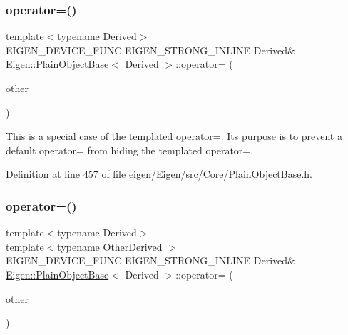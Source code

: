 \subsubsection{\texorpdfstring{operator=()}{operator=()}\hspace{0.1cm}{\footnotesize\ttfamily [2/4]}}
{\footnotesize\ttfamily template$<$typename Derived$>$ \\
E\+I\+G\+E\+N\+\_\+\+D\+E\+V\+I\+C\+E\+\_\+\+F\+U\+NC E\+I\+G\+E\+N\+\_\+\+S\+T\+R\+O\+N\+G\+\_\+\+I\+N\+L\+I\+NE Derived\& \hyperlink{class_eigen_1_1_plain_object_base}{Eigen\+::\+Plain\+Object\+Base}$<$ Derived $>$\+::operator= (\begin{DoxyParamCaption}\item[{const \hyperlink{class_eigen_1_1_plain_object_base}{Plain\+Object\+Base}$<$ Derived $>$ \&}]{other }\end{DoxyParamCaption})\hspace{0.3cm}{\ttfamily [inline]}}

This is a special case of the templated operator=. Its purpose is to prevent a default operator= from hiding the templated operator=. 

Definition at line \hyperlink{eigen_2_eigen_2src_2_core_2_plain_object_base_8h_source_l00457}{457} of file \hyperlink{eigen_2_eigen_2src_2_core_2_plain_object_base_8h_source}{eigen/\+Eigen/src/\+Core/\+Plain\+Object\+Base.\+h}.

\mbox{\label{class_eigen_1_1_plain_object_base_a6d280056e43429f043e8b25262ee6153}} 
\subsubsection{\texorpdfstring{operator=()}{operator=()}\hspace{0.1cm}{\footnotesize\ttfamily [3/4]}}
{\footnotesize\ttfamily template$<$typename Derived$>$ \\
template$<$typename Other\+Derived $>$ \\
E\+I\+G\+E\+N\+\_\+\+D\+E\+V\+I\+C\+E\+\_\+\+F\+U\+NC E\+I\+G\+E\+N\+\_\+\+S\+T\+R\+O\+N\+G\+\_\+\+I\+N\+L\+I\+NE Derived\& \hyperlink{class_eigen_1_1_plain_object_base}{Eigen\+::\+Plain\+Object\+Base}$<$ Derived $>$\+::operator= (\begin{DoxyParamCaption}\item[{const \hyperlink{group___core___module_struct_eigen_1_1_eigen_base}{Eigen\+Base}$<$ Other\+Derived $>$ \&}]{other }\end{DoxyParamCaption})\hspace{0.3cm}{\ttfamily [inline]}}



